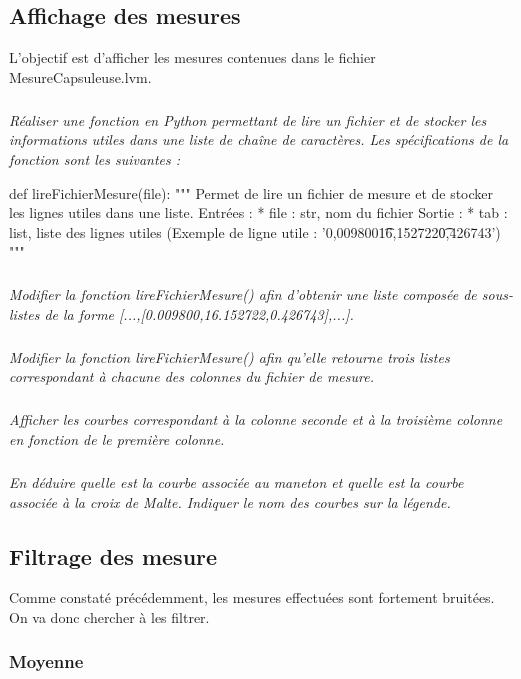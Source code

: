 \documentclass[10pt]{article}
\begin{document}
\subsection*{Affichage des mesures}

\begin{obj}
L'objectif est d'afficher les mesures contenues dans le fichier \textsf{MesureCapsuleuse.lvm}.
\end{obj}




\subparagraph{}
\textit{Réaliser une fonction en Python permettant de lire un fichier et de stocker les informations utiles dans une liste de chaîne de caractères. Les spécifications de la fonction sont les suivantes :}

\begin{py}
\begin{python}
def lireFichierMesure(file):
    """
    Permet de lire un fichier de mesure et de stocker les lignes utiles dans une liste.
    Entrées : 
      * file : str, nom du fichier
    Sortie :
      * tab : list, liste des lignes utiles
          (Exemple de ligne utile : '0,009800\t16,152722\t0,426743\n')
    """
\end{python}
\end{py}

\subparagraph{}
\textit{Modifier la fonction \textsf{lireFichierMesure()} afin d'obtenir une liste composée de sous-listes de la forme \textsf{[...,[0.009800,16.152722,0.426743],...]}.}

\subparagraph{}
\textit{Modifier la fonction \textsf{lireFichierMesure()} afin qu'elle retourne trois listes correspondant à chacune des colonnes du fichier de mesure.}


\subparagraph{}
\textit{Afficher les courbes correspondant à la colonne seconde et à la troisième colonne en fonction de le première colonne.}

\subparagraph{}
\textit{En déduire quelle est la courbe associée au maneton et quelle est la courbe associée à la croix de Malte. Indiquer le nom des courbes sur la légende.}

\subsection*{Filtrage des mesure}
Comme constaté précédemment, les mesures effectuées sont fortement bruitées. On va donc chercher à les filtrer. 

\subsubsection*{\normalsize Moyenne}
\end{document}
